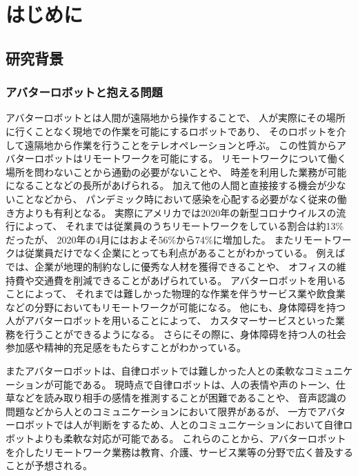 \documentclass{kuisthesis}
\begin{document}

\tableofcontents


\pagestyle{fancy}
\lhead{\rightmark}
\renewcommand{\chaptermark}[1]{\markboth{第\ \normalfont\thechapter\ 章~~#1}{}}

\chapter{はじめに} %

\section{研究背景} %

\subsection{アバターロボットと抱える問題} %
アバターロボットとは人間が遠隔地から操作することで、
人が実際にその場所に行くことなく現地での作業を可能にするロボットであり、
そのロボットを介して遠隔地から作業を行うことをテレオペレーションと呼ぶ。
この性質からアバターロボットはリモートワークを可能にする。
リモートワークについて働く場所を問わないことから通勤の必要がないことや、
時差を利用した業務が可能になることなどの長所があげられる。
加えて他の人間と直接接する機会が少ないことなどから、
パンデミック時において感染を心配する必要がなく従来の働き方よりも有利となる。
実際にアメリカでは2020年の新型コロナウイルスの流行によって、
それまでは従業員のうちリモートワークをしている割合は約13\%だったが、
2020年の4月にはおよそ56\%から74\%に増加した\cite{ozimek2020future}。
またリモートワークは従業員だけでなく企業にとっても利点があることがわかっている。
例えば\cite{FERREIRA202170}では、企業が地理的制約なしに優秀な人材を獲得できることや、
オフィスの維持費や交通費を削減できることがあげられている。
アバターロボットを用いることによって、
それまでは難しかった物理的な作業を伴うサービス業や飲食業などの分野においてもリモートワークが可能になる。
他にも、身体障碍を持つ人がアバターロボットを用いることによって、
カスタマーサービスといった業務を行うことができるようになる。
さらにその際に、身体障碍を持つ人の社会参加感や精神的充足感をもたらすことがわかっている\cite{takeuchi2020avatar}。

またアバターロボットは、自律ロボットでは難しかった人との柔軟なコミュニケーションが可能である。
現時点で自律ロボットは、人の表情や声のトーン、仕草などを読み取り相手の感情を推測することが困難であることや、
音声認識の問題などから人とのコミュニケーションにおいて限界があるが、
一方でアバターロボットでは人が判断をするため、人とのコミュニケーションにおいて自律ロボットよりも柔軟な対応が可能である。
これらのことから、アバターロボットを介したリモートワーク業務は教育、介護、サービス業等の分野で広く普及することが予想される。
\end{document}
